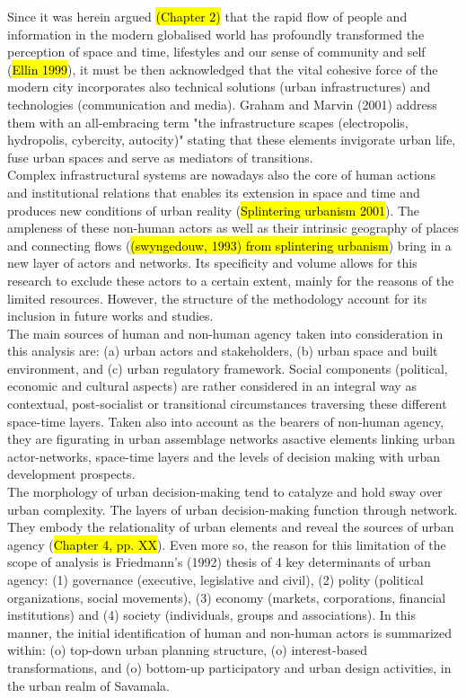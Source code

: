 \documentclass[11pt]{report}
\begin{document}
Since it was herein argued \hl{(Chapter 2)} that the rapid flow of people and information in the modern globalised world has profoundly transformed the perception of space and time, lifestyles and our sense of community and self (\hl{Ellin 1999}), it must be then acknowledged that the vital cohesive force of the modern city incorporates also technical solutions (urban infrastructures) and technologies (communication and media).
Graham and Marvin (2001) address them with an  all-embracing term "the infrastructure scapes (electropolis, hydropolis, cybercity, autocity)" stating that these elements invigorate urban life, fuse urban spaces and serve as mediators of transitions.
\\

Complex infrastructural systems are nowadays also the core of human actions and institutional relations that enables its extension in space and time and produces new conditions of urban reality (\hl{Splintering urbanism 2001}).
The ampleness of these non-human actors as well as their intrinsic geography of places and connecting flows (\hl{(swyngedouw, 1993) from splintering urbanism}) bring in a new layer of actors and networks.
Its specificity and volume allows for this research to exclude these actors to a certain extent, mainly for the reasons of the limited resources. 
However, the structure of the methodology account for its inclusion in future works and studies. 
\\

The main sources of human and non-human agency taken into consideration in this analysis are: (a) urban actors and stakeholders, (b) urban space and built environment, and (c) urban regulatory framework.
Social components (political, economic and cultural aspects) are rather considered in an integral way as contextual, post-socialist or transitional circumstances traversing these different space-time layers.
Taken also into account as the bearers of non-human agency, they are figurating in urban assemblage networks asactive elements linking urban actor-networks, space-time layers and the levels of decision making with urban development prospects.
\\

The morphology of urban decision-making tend to catalyze and hold sway over urban complexity.
The layers of urban decision-making function through network. They embody the relationality of urban elements and reveal the sources of urban agency (\hl{Chapter 4, pp. XX}).
Even more so, the reason for this limitation of the scope of analysis is Friedmann's (1992) thesis of 4 key determinants of urban agency:
(1) governance (executive, legislative and civil),
(2) polity (political organizations, social movements),
(3) economy (markets, corporations, financial institutions) and
(4) society (individuals, groups and associations).
In this manner, the initial identification of human and non-human actors is summarized within:
(o) top-down urban planning structure,
(o) interest-based transformations,
and
(o) bottom-up participatory and urban design activities, in the urban realm of Savamala.
\end{document}
